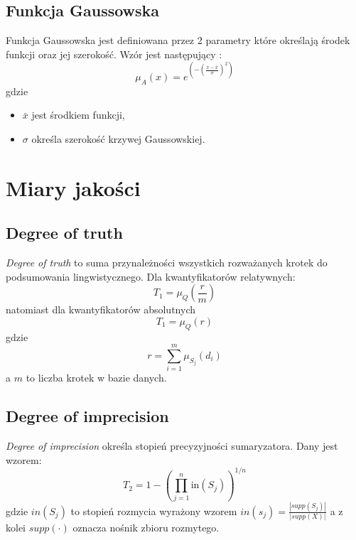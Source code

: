 \documentclass{classrep}
\begin{document}
	
	
	
	\subsection{Funkcja Gaussowska} 
	Funkcja Gaussowska jest definiowana przez 2 parametry które określają środek funkcji oraz jej szerokość. Wzór jest następujący \cite{kul}:
	\begin{equation}
		\mu_A(x) = e^{(-(\frac{x - \bar{x}}{\sigma})^2)}
	\end{equation}
	gdzie 
	\begin{itemize}
		\item $\bar{x}$ jest środkiem funkcji,
		\item $\sigma$ określa szerokość krzywej Gaussowskiej. 
	\end{itemize}
	
	\section{Miary jakości}

	\subsection{Degree of truth}
\textsl{Degree of truth} to suma przynależności wszystkich rozważanych krotek do podsumowania lingwistycznego.
	Dla kwantyfikatorów relatywnych:
	\begin{equation}
	T_1 = \mu_Q(\frac{r}{m})
	\end{equation}
natomiast dla kwantyfikatorów absolutnych
	\begin{equation}
	T_1 = \mu_Q(r)
	\end{equation}
gdzie 
	\begin{equation}
r = \sum_{i=1}^{m} \mu_{S_j} (d_i)
	\end{equation}
a $m$ to liczba krotek w bazie danych.


	\subsection{Degree of imprecision}
\textsl{Degree of imprecision} określa stopień precyzyjności sumaryzatora. Dany jest wzorem:
	\begin{equation}
T_2 = 1 - \left(\prod_{j=1}^{n} \mathrm{in}(S_j)\right)^{1/n}
	\end{equation}
gdzie $in(S_j)$ to stopień rozmycia wyrażony wzorem
$
in(s_j) = \frac{|supp(S_j)|}{|supp(X)|}
$
a z kolei $supp(\cdot)$ oznacza nośnik zbioru rozmytego.
\end{document}
